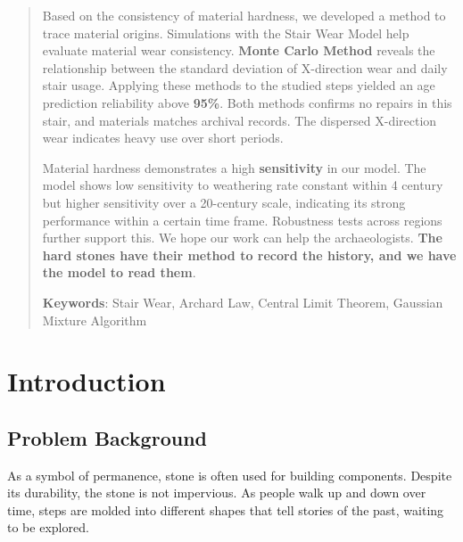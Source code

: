 \documentclass[12pt]{article}  %
\numberwithin{equation}{section} %
\begin{document}
\begin{abstract}
    Based on the consistency of material hardness, we developed a method to trace material origins. Simulations with the Stair Wear Model help evaluate material wear consistency. \textbf{Monte Carlo Method} reveals the relationship between the standard deviation of X-direction wear and daily stair usage. Applying these methods to the studied steps yielded an age prediction reliability above \textbf{95\%}. Both methods confirms no repairs in this stair, and materials matches archival records. The dispersed X-direction wear indicates heavy use over short periods.

Material hardness demonstrates a high \textbf{sensitivity} in our model. The model shows low sensitivity to weathering rate constant within 4 century but higher sensitivity over a 20-century scale, indicating its strong performance within a certain time frame. Robustness tests across regions further support this. We hope our work can help the archaeologists. \textbf{The hard stones have their method to record the history, and we have the model to read them}. 

   
	\vspace{5pt}
	\textbf{Keywords}:  Stair Wear, Archard Law, Central Limit Theorem, Gaussian Mixture Algorithm
	
\end{abstract}
\maketitle  %
\tableofcontents


\section{Introduction}

\subsection{Problem Background}
As a symbol of permanence, stone is often used for building components. Despite its durability, the stone is not impervious. As people walk up and down over time, steps are molded into different shapes that tell stories of the past, waiting to be explored.
\end{document}
